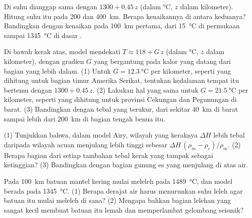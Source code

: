 \begin{exercise}[$\star\star$]\label{exo:g11:lithosphere-asthenosphere:11}
Di  suhu dianggap sama dengan $1300 + 0.45\,z$ (dalam
\unit{\celsius}, $z$ dalam kilometer). Hitung suhu itu pada 200 dan \qty{400}{km}.
Berapa kenaikannya di antara keduanya? Bandingkan dengan kenaikan pada
\qty{100}{km} pertama, dari \qty{15}{\celsius} di permukaan sampai
\qty{1345}{\celsius} di dasar .
\end{exercise}

\begin{exercise}[$\star\star\star$]\label{exo:g11:lithosphere-asthenosphere:12}
Di bawah kerak atas,  model mendekati $T \approx 118 +
G\,z$ (dalam \unit{\celsius}, $z$ dalam kilometer), dengan gradien $G$ yang
bergantung pada kalor yang datang dari bagian yang lebih dalam. (1) Untuk $G =
\qty{12.3}{\celsius}$ per kilometer, seperti yang dihitung untuk bagian timur
Amerika Serikat, tentukan kedalaman tempat  itu bertemu dengan
$1300 + 0.45\,z$. (2) Lakukan hal yang sama untuk $G = \qty{21.5}{\celsius}$
per kilometer, seperti yang dihitung untuk provinsi
Cekungan dan Pegunungan di barat.
(3) Bandingkan dengan tebal yang terukur, dari sekitar \qty{40}{km} di barat
sampai lebih dari \qty{200}{km} di bagian tengah benua itu.
\end{exercise}

\begin{exercise}[$\star\star\star$]\label{exo:g11:lithosphere-asthenosphere:13}
(1) Tunjukkan bahwa, dalam model Airy, wilayah yang keraknya $\Delta H$ lebih
tebal daripada wilayah acuan menjulang lebih tinggi sebesar
$\Delta H\,(\rho_m - \rho_c)/\rho_m$. (2) Berapa bagian dari setiap tambahan
tebal kerak yang tampak sebagai ketinggian? (3) Bandingkan dengan bagian gunung
es yang menjulang di atas air.
\end{exercise}

\begin{exercise}[$\star\star\star$]\label{exo:g11:lithosphere-asthenosphere:14}
Pada \qty{100}{km} batuan mantel kering mulai meleleh pada \qty{1489}{\celsius},
dan  model berada pada \qty{1345}{\celsius}. (1) Berapa derajat air harus
menurunkan suhu leleh agar batuan itu mulai meleleh di sana? (2) Mengapa bahkan
bagian lelehan yang sangat kecil membuat batuan itu lemah dan memperlambat
gelombang seismik?
\end{exercise}


